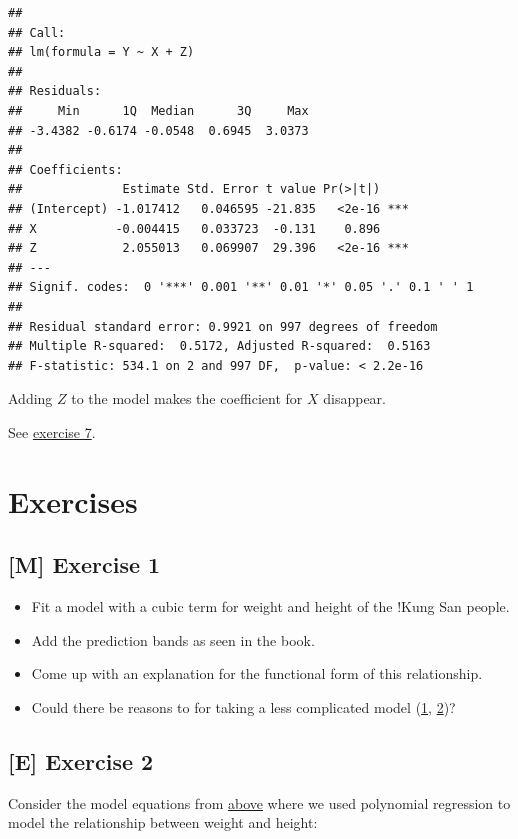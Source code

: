 \documentclass[
]{book}
\providecommand{\tightlist}{%
  \setlength{\itemsep}{0pt}\setlength{\parskip}{0pt}}
\begin{document}
\begin{verbatim}
## 
## Call:
## lm(formula = Y ~ X + Z)
## 
## Residuals:
##     Min      1Q  Median      3Q     Max 
## -3.4382 -0.6174 -0.0548  0.6945  3.0373 
## 
## Coefficients:
##              Estimate Std. Error t value Pr(>|t|)    
## (Intercept) -1.017412   0.046595 -21.835   <2e-16 ***
## X           -0.004415   0.033723  -0.131    0.896    
## Z            2.055013   0.069907  29.396   <2e-16 ***
## ---
## Signif. codes:  0 '***' 0.001 '**' 0.01 '*' 0.05 '.' 0.1 ' ' 1
## 
## Residual standard error: 0.9921 on 997 degrees of freedom
## Multiple R-squared:  0.5172, Adjusted R-squared:  0.5163 
## F-statistic: 534.1 on 2 and 997 DF,  p-value: < 2.2e-16
\end{verbatim}

Adding \(Z\) to the model makes the coefficient for \(X\) disappear.

See \hyperref[exercise7_multiple_regression]{exercise 7}.

\section{Exercises}\label{exercises-2}

\subsection{{[}M{]} Exercise 1}\label{exercise1_multiple_regression}

\begin{itemize}
\tightlist
\item
  Fit a model with a cubic term for weight and height of the !Kung San people.
\item
  Add the prediction bands as seen in the book.
\item
  Come up with an explanation for the functional form of this relationship.
\item
  Could there be reasons to for taking a less complicated model
  (\href{https://en.wikipedia.org/wiki/Statistical_model_specification}{1}, \href{https://en.wikipedia.org/wiki/Occam\%27s_razor}{2})?
\end{itemize}

\subsection{{[}E{]} Exercise 2}\label{exercise2_multiple_regression}

Consider the model equations from \hyperref[adding_transformed_predictor]{above}
where we used polynomial regression to model the relationship between
weight and height:
\end{document}

